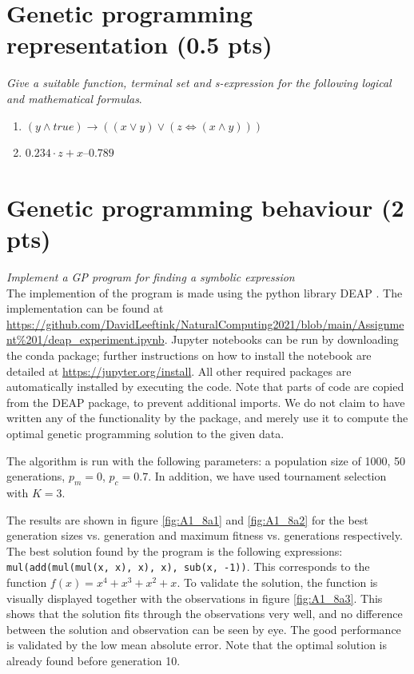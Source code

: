 \documentclass{article}
\begin{document}
\section{Genetic programming representation (0.5 pts)}
\textit{Give a suitable function, terminal
set and s-expression for the following logical and mathematical formulas}.
\begin{enumerate}[label=\alph*)]
    \item $(y \land true) \to ((x \lor y) \lor (z \iff (x \land y)))$ \\
    \item $0.234 \cdot z + x–0.789$
\end{enumerate}

\section{Genetic programming behaviour (2 pts)}
\textit{Implement a GP program for finding a
symbolic expression } \\ 

The implemention of the program is made using the python library DEAP \cite{deap}. The implementation can be found at \url{https://github.com/DavidLeeftink/NaturalComputing2021/blob/main/Assignment\%201/deap_experiment.ipynb}. Jupyter notebooks can be run by downloading the conda package; further instructions on how to install the notebook are detailed at \url{https://jupyter.org/install}. All other required packages are automatically installed by executing the code. Note that parts of code are copied from the DEAP package, to prevent additional imports. We do not claim to have written any of the functionality by the package, and merely use it to compute the optimal genetic programming solution to the given data.

The algorithm is run with the following parameters: a population size of 1000, 50 generations, $p_m = 0$, $p_c = 0.7$. In addition, we have used tournament selection with $K=3$. 

The results are shown in figure \ref{fig:A1_8a1} and \ref{fig:A1_8a2} for the best generation sizes vs. generation and maximum fitness vs. generations respectively. The best solution found by the program is the following expressions: \texttt{mul(add(mul(mul(x, x), x), x), sub(x, -1))}. This corresponds to the function $f(x) = x^4+x^3+x^2+x$. To validate the solution, the function is visually displayed together with the observations in figure \ref{fig:A1_8a3}. This shows that the solution fits through the observations very well, and no difference between the solution and observation can be seen by eye. The good performance is validated by the low mean absolute error. Note that the optimal solution is already found before generation 10. 
\end{document}
